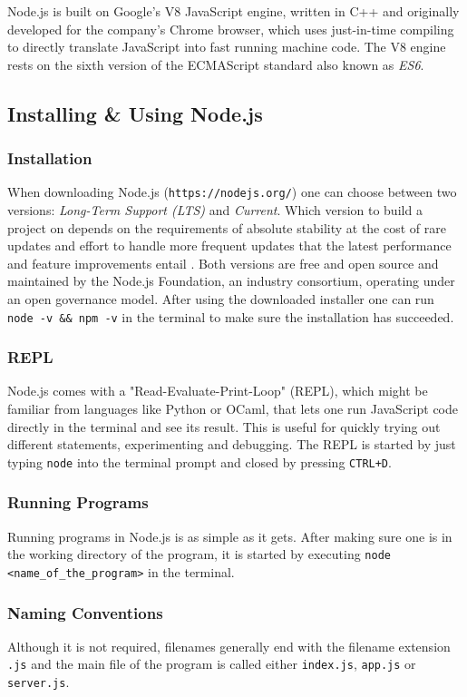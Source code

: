 \documentclass{bioinfo}
\begin{document}
Node.js is built on Google's V8 JavaScript engine, written in C++ and originally developed for the company's Chrome browser, which uses just-in-time compiling to directly translate JavaScript into fast running machine code. The V8 engine rests on the sixth version of the ECMAScript standard also known as \textit{ES6}. \cite{nodejsv8}

\subsection{Installing \& Using Node.js}
\subsubsection{Installation}
When downloading Node.js (\texttt{https://nodejs.org/}) one can choose between two versions: \textit{Long-Term Support (LTS)} and \textit{Current}. Which version to build a project on depends on the requirements of absolute stability at the cost of rare updates and effort to handle more frequent updates that the latest performance and feature improvements entail \cite{nodejsreleases}.
Both versions are free and open source and maintained by the Node.js Foundation, an industry consortium, operating under an open governance model. \cite{nodejswelcome} After using the downloaded installer one can run \texttt{node -v \&\& npm -v} in the terminal to make sure the installation has succeeded.

\subsubsection{REPL}
Node.js comes with a "Read-Evaluate-Print-Loop" (REPL), which might be familiar from languages like Python or OCaml, that lets one run JavaScript code directly in the terminal and see its result. This is useful for quickly trying out different statements, experimenting and debugging. The REPL is started by just typing \texttt{node} into the terminal prompt and closed by pressing \texttt{CTRL+D}.

\subsubsection{Running Programs}
Running programs in Node.js is as simple as it gets. After making sure one is in the working directory of the program, it is started by executing \texttt{node <name\_of\_the\_program>} in the terminal.

\subsubsection{Naming Conventions}
Although it is not required, filenames generally end with the filename extension \texttt{.js} and the main file of the program is called either \texttt{index.js}, \texttt{app.js} or \texttt{server.js}.
\end{document}

